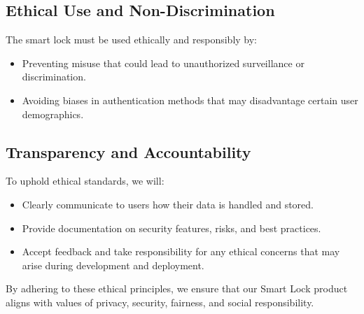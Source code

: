 \subsection*{Ethical Use and Non-Discrimination}
The smart lock must be used ethically and responsibly by:
\begin{itemize}
    \item Preventing misuse that could lead to unauthorized surveillance or discrimination.
    \item Avoiding biases in authentication methods that may disadvantage certain user demographics.
\end{itemize}

\subsection*{Transparency and Accountability}
To uphold ethical standards, we will:
\begin{itemize}
    \item Clearly communicate to users how their data is handled and stored.
    \item Provide documentation on security features, risks, and best practices.
    \item Accept feedback and take responsibility for any ethical concerns that may arise during development and deployment.
\end{itemize}

By adhering to these ethical principles, we ensure that our Smart Lock product aligns with values of privacy, security, fairness, and social responsibility.
